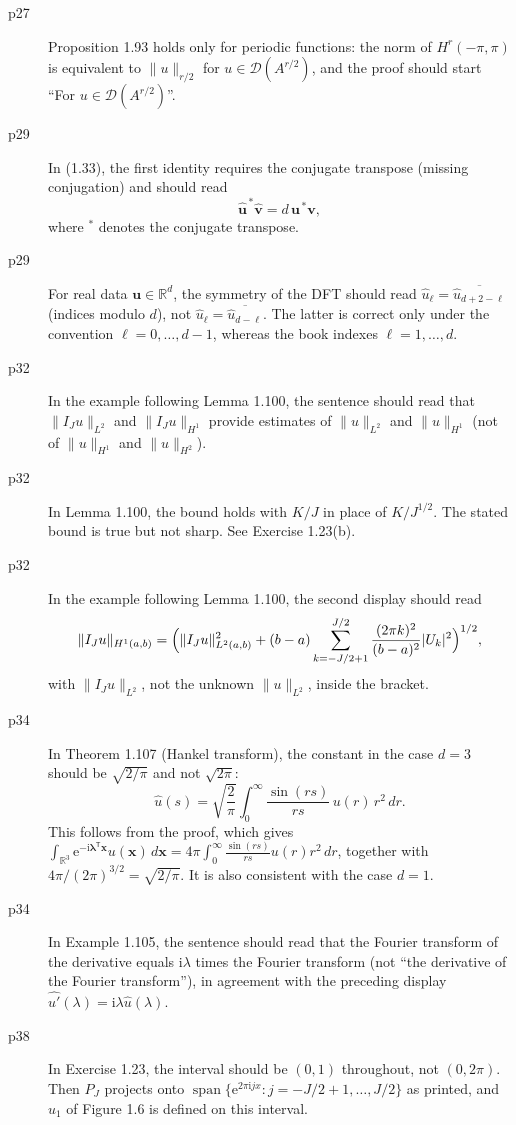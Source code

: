 \documentclass[final]{article}
\theoremstyle{definition}
\newcommand{\vecbs}[1]{\boldsymbol{#1}}
\renewcommand{\vec}[1]{{\vecbs{#1}}}
\begin{document}
\begin{enumerate}
\begin{description}
   \item[p27] Proposition 1.93 holds only for periodic functions: the norm of
$H^r(-\pi,\pi)$ is equivalent to $\|u\|_{r/2}$ for
$u\in\mathcal{D}(A^{r/2})$, and the proof should start ``For
$u\in\mathcal{D}(A^{r/2})$''.
   \item[p29] In (1.33), the first identity requires the conjugate transpose (missing conjugation)
and should read
\[
\widehat{\vec u}^{\,*}\widehat{\vec v} = d\,\vec u^{\,*}\vec v,
\]
where ${}^{*}$ denotes the conjugate transpose. 
   \item[p29] For real data $\vec u\in\mathbb{R}^d$, the symmetry of the DFT
should read $\hat u_\ell = \overline{\hat u_{d+2-\ell}}$ (indices modulo $d$),
not $\hat u_\ell=\overline{\hat u_{d-\ell}}$. The latter is correct only under
the convention $\ell=0,\dots,d-1$, whereas the book indexes
$\ell=1,\dots,d$.
   \item[p32] In the example following Lemma 1.100, the sentence should read
that $\|I_Ju\|_{{L}^2}$ and $\|I_Ju\|_{{H}^1}$ provide estimates of
$\|u\|_{{L}^2}$ and $\|u\|_{{H}^1}$ (not of $\|u\|_{{H}^1}$ and
$\|u\|_{{H}^2}$).
   \item[p32] In Lemma 1.100, the bound holds with $K/J$ in place of
$K/J^{1/2}$. The stated bound is true but not sharp. See  Exercise 1.23(b).
   \item[p32] In the example following Lemma 1.100, the second display should
read
\[
\|I_Ju\|_{H^1(a,b)}=\Bigl(\|I_Ju\|^2_{L^2(a,b)}+(b-a)\sum_{k=-J/2+1}^{J/2}
\frac{(2\pi k)^2}{(b-a)^2}|U_k|^2\Bigr)^{1/2},
\]
with $\|I_Ju\|_{L^2}$, not the unknown $\|u\|_{L^2}$, inside the bracket.
   \item[p34] In Theorem 1.107 (Hankel transform), the constant in the case
$d=3$ should be $\sqrt{2/\pi}$ and not $\sqrt{2\pi}$:
\[
\hat u(s) = \sqrt{\frac{2}{\pi}}\int_0^\infty \frac{\sin (r s )}{r s}\,u(r)\,
r^2 \, dr .
\]
This follows from the proof, which gives $\int_{\mathbb{R}^3} \mathrm{e}^{-
\mathrm{i}\vec\lambda^{\mathsf{T}}\vec x} u(\vec x)\,d\vec x = 4\pi\int_0^\infty
\frac{\sin (rs)}{rs}u(r) r^2\,dr$, together with
$4\pi/(2\pi)^{3/2}=\sqrt{2/\pi}$. It is also consistent with the case $d=1$.
   \item[p34] In Example 1.105, the sentence should read that the Fourier
transform of the derivative equals $\mathrm{i}\lambda$ times the Fourier
transform (not ``the derivative of the Fourier transform''), in agreement with
the preceding display $\widehat{u'}(\lambda)=\mathrm{i}\lambda\hat u(\lambda)$.
   \item[p38] In Exercise 1.23, the interval should be $(0,1)$ throughout, not
$(0,2\pi)$. Then $P_J$ projects onto
$\operatorname{span}\{\mathrm{e}^{2\pi\mathrm{i}jx}\colon j=-J/2+1,\dots,J/2\}$
as printed, and $u_1$ of Figure 1.6 is defined on this interval.


\end{description}
\end{enumerate}
\end{document}
